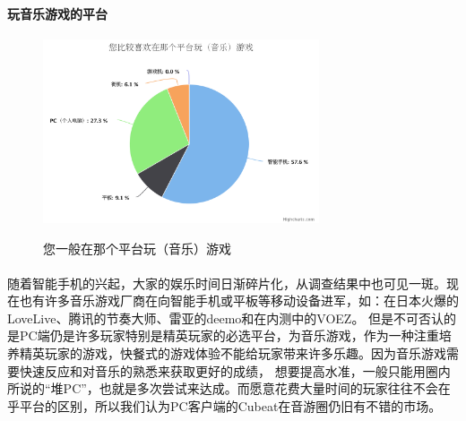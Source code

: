 \documentclass{article} \usepackage{CJK}
\begin{document}
\paragraph{玩音乐游戏的平台}
\begin{figure}[H]
  \centering
  \includegraphics[width=22em]{chart2.png}\\
  \caption{您一般在那个平台玩（音乐）游戏}\label{2-2}
\end{figure}
\paragraph{}
随着智能手机的兴起，大家的娱乐时间日渐碎片化，从调查结果中也可见一斑。现在也有许多音乐游戏厂商在向智能手机或平板等移动设备进军，如：在日本火爆的LoveLive、腾讯的节奏大师、雷亚的deemo和在内测中的VOEZ。
但是不可否认的是PC端仍是许多玩家特别是精英玩家的必选平台，为音乐游戏，作为一种注重培养精英玩家的游戏，快餐式的游戏体验不能给玩家带来许多乐趣。因为音乐游戏需要快速反应和对音乐的熟悉来获取更好的成绩，
想要提高水准，一般只能用圈内所说的“堆PC”，也就是多次尝试来达成。而愿意花费大量时间的玩家往往不会在乎平台的区别，所以我们认为PC客户端的Cubeat在音游圈仍旧有不错的市场。
\end{document}
